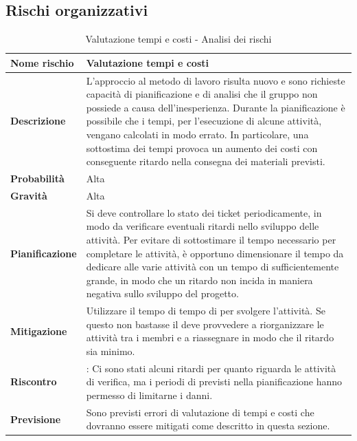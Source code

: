 \documentclass[12pt,a4paper]{article}
\begin{document}
\subsection{Rischi organizzativi}

\begin{table}[H]
	\begin{center}
		\begin{tabular}{p{} p{}}
			\toprule
			\textbf{Nome rischio} & \textbf{Valutazione tempi e costi} \\
			\midrule
			\midrule
			\textbf{Descrizione} & L’approccio al metodo di lavoro risulta nuovo e sono richieste capacità di pianificazione e di analisi che il gruppo non possiede a causa dell’inesperienza. Durante la pianificazione è possibile che i tempi, per l’esecuzione di alcune attività, vengano calcolati in modo errato. In particolare, una sottostima dei tempi provoca un aumento dei costi con conseguente ritardo nella consegna dei materiali previsti. \\
			\midrule
			\textbf{Probabilità} & Alta \\
			\midrule
			\textbf{Gravità} & Alta \\
			\midrule
			\textbf{Pianificazione} & Si deve controllare lo stato dei ticket periodicamente, in modo da verificare eventuali ritardi nello sviluppo delle attività. Per evitare di sottostimare il tempo necessario per completare le attività, è opportuno dimensionare il tempo da dedicare alle varie attività con un tempo di \mgls{slack} sufficientemente grande, in modo che un ritardo non incida in maniera negativa sullo sviluppo del progetto. \\
			\midrule
			\textbf{Mitigazione} & Utilizzare il tempo di tempo di \mgls{slack} per svolgere l'attività. Se questo non bastasse il \PM{} deve provvedere a riorganizzare le attività tra i membri e a riassegnare \mgls{task} in modo che il ritardo sia minimo. \\
			\midrule
			\textbf{Riscontro} & \textbf{\FA{}}: Ci sono stati alcuni ritardi per quanto riguarda le attività di verifica, ma i periodi di \mgls{slack} previsti nella pianificazione hanno permesso di limitarne i danni. \\
            \midrule
            \textbf{Previsione} & Sono previsti errori di valutazione di tempi e costi che dovranno essere mitigati come descritto in questa sezione. \\
			\bottomrule
		\end{tabular}
		\caption{Valutazione tempi e costi - Analisi dei rischi}
	\end{center}
\end{table}
\end{document}
